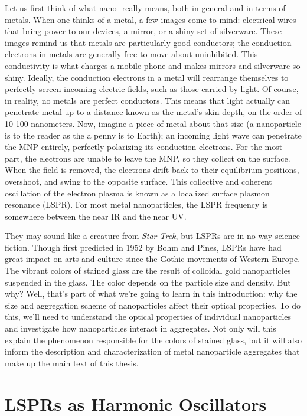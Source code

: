 \documentclass [11pt, proquest] {uwthesis}[2016/11/22]
\begin{document}
Let us first think of what nano- really means, both in general and in terms of metals. When one thinks of a metal, a few images come to mind: electrical wires that bring power to our devices, a mirror, or a shiny set of silverware. These images remind us that metals are particularly good conductors; the conduction electrons in metals are generally free to move about uninhibited. This conductivity is what charges a mobile phone and makes mirrors and silverware so shiny. Ideally, the conduction electrons in a metal will rearrange themselves to perfectly screen incoming electric fields, such as those carried by light. Of course, in reality, no metals are perfect conductors. This means that light actually can penetrate metal up to a distance known as the metal's skin-depth, on the order of 10-100 nanometers. Now, imagine a piece of metal about that size (a nanoparticle is to the reader as the a penny is to Earth); an incoming light wave can penetrate the MNP entirely, perfectly polarizing its conduction electrons. For the most part, the electrons are unable to leave the MNP, so they collect on the surface. When the field is removed, the electrons drift back to their equilibrium positions, overshoot, and swing to the opposite surface. This collective and coherent oscillation of the electron plasma is known as a localized surface plasmon resonance (LSPR). For most metal nanoparticles, the LSPR frequency is somewhere between the near IR and the near UV.

They may sound like a creature from {\it Star Trek}, but LSPRs are in no way science fiction. Though first predicted in 1952 by Bohm and Pines, LSPRs have had great impact on arts and culture since the Gothic movements of Western Europe. The vibrant colors of stained glass are the result of colloidal gold nanoparticles suspended in the glass. The color depends on the particle size and density. But why? Well, that's part of what we're going to learn in this introduction: why the size and aggregation scheme of nanoparticles affect their optical properties. To do this, we'll need to understand the optical properties of individual nanoparticles and investigate how nanoparticles interact in aggregates. Not only will this explain the phenomenon responsible for the colors of stained glass, but it will also inform the description and characterization of metal nanoparticle aggregates that make up the main text of this thesis.

\section{LSPRs as Harmonic Oscillators}
\end{document}
